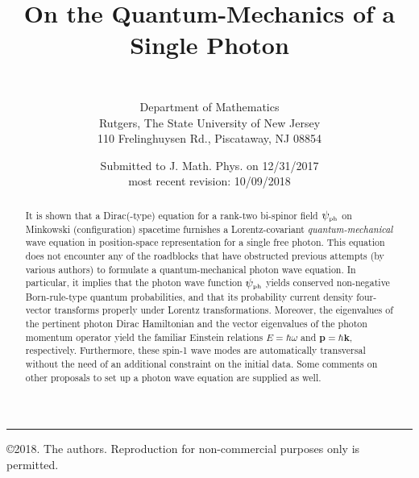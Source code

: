 \documentclass[11pt]{article}
\theoremstyle{definition}
\newcommand{\vect}[1] {\boldsymbol{{ #1}} }
\newcommand{\kV}{{\vect{k}}}		%
\newcommand{\pV}{{\vect{p}}}            %
\numberwithin{equation}{section}
\newcommand{\psiPH}{{\psi_{\mbox{\rm\tiny ph}}}}
\begin{document}
\title{On the Quantum-Mechanics of a Single Photon}

\author{\normalsize{}\\
	{$\phantom{nix}$}\\[-0.1cm] 
        \normalsize Department of Mathematics\\[-0.1cm]
	Rutgers, The State University of New Jersey\\[-0.1cm]
	110 Frelinghuysen Rd., Piscataway, NJ 08854}
\vspace{-0.3cm}
\date{Submitted to J. Math. Phys. on 12/31/2017\\
 most recent revision: 10/09/2018} %
\maketitle
%
%
%
\begin{abstract}
\noindent
 It is shown that a Dirac(-type) equation for a rank-two bi-spinor field $\psiPH$ on Minkowski (configuration) spacetime
furnishes a Lorentz-covariant \emph{quantum-mechanical} wave equation in position-space representation for a single free photon.
 This equation does not encounter any of the roadblocks that have obstructed previous attempts (by various authors) to formulate 
a {quantum-mechanical} photon wave equation.  
 In particular, it implies that the photon wave function $\psiPH$ yields conserved 
non-negative Born-rule-type quantum probabilities,  
and that its probability current density four-vector transforms properly under Lorentz transformations.
 Moreover, the eigenvalues of the pertinent photon Dirac Hamiltonian and the vector eigenvalues of the photon momentum operator 
yield the familiar Einstein relations $E=\hbar\omega$ and $\pV=\hbar\kV$, respectively. 
 Furthermore, these spin-1 wave modes are automatically transversal without the need of an additional constraint on the initial data.
 Some comments on  other proposals to set up a photon wave equation are supplied as well.
\end{abstract}

\smallskip

\vfill
\hrule
\smallskip
\copyright{2018. The authors. Reproduction for non-commercial purposes only is permitted.}
\end{document}
